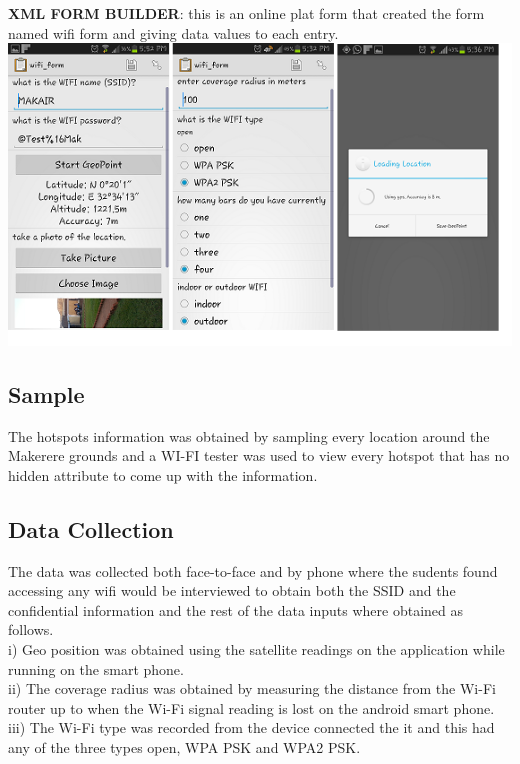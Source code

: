 \documentclass[14pt, a4paper]{article}
\begin{document}
\textbf{XML FORM BUILDER}: this is an online plat form that created the form named wifi form and giving data values to each entry.\\


\includegraphics{d}

			\subsection{Sample}


The hotspots information was obtained by sampling every location around the Makerere grounds and a WI-FI tester was used to view every hotspot that has no hidden attribute to come up with the information.\\

			\subsection{Data Collection}

The data was collected both face-to-face and by phone where the sudents found accessing any wifi would be interviewed to obtain both the SSID and the confidential information and the rest of the data inputs where obtained as follows.\\

i)	Geo position was obtained using the satellite readings on the application while running on the smart phone.\\
ii)	The coverage radius was obtained by measuring the distance from the Wi-Fi router up to when the Wi-Fi signal reading is lost on the android smart phone.\\

iii)	The Wi-Fi type was recorded from the device connected the it and this had any of the three types open, WPA PSK and WPA2 PSK.\\
\end{document}

